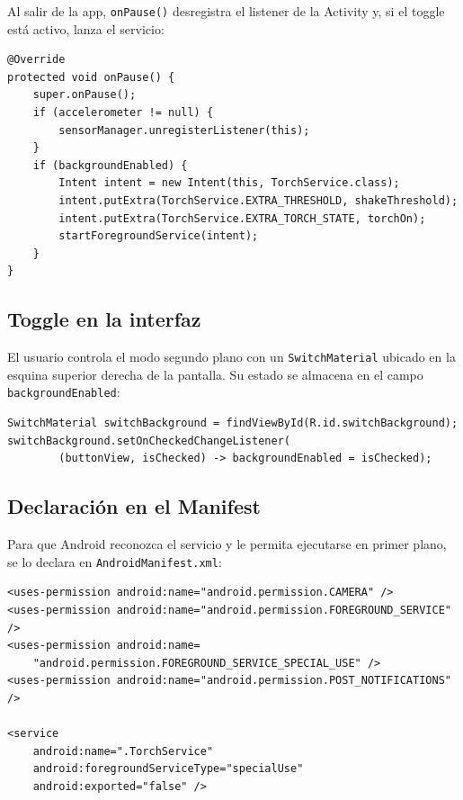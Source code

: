 \documentclass[12pt, a4paper]{article}
\begin{document}
Al salir de la app, \texttt{onPause()} desregistra el listener de la Activity
y, si el toggle est\'a activo, lanza el servicio:

\begin{lstlisting}[caption={Traspaso hacia el servicio al pausar --- \texttt{MainActivity.java}}]
@Override
protected void onPause() {
    super.onPause();
    if (accelerometer != null) {
        sensorManager.unregisterListener(this);
    }
    if (backgroundEnabled) {
        Intent intent = new Intent(this, TorchService.class);
        intent.putExtra(TorchService.EXTRA_THRESHOLD, shakeThreshold);
        intent.putExtra(TorchService.EXTRA_TORCH_STATE, torchOn);
        startForegroundService(intent);
    }
}
\end{lstlisting}

\subsection{Toggle en la interfaz}

El usuario controla el modo segundo plano con un \texttt{SwitchMaterial}
ubicado en la esquina superior derecha de la pantalla. Su estado se almacena
en el campo \texttt{backgroundEnabled}:

\begin{lstlisting}[caption={Toggle de modo segundo plano --- \texttt{MainActivity.java}}]
SwitchMaterial switchBackground = findViewById(R.id.switchBackground);
switchBackground.setOnCheckedChangeListener(
        (buttonView, isChecked) -> backgroundEnabled = isChecked);
\end{lstlisting}

\subsection{Declaraci\'on en el Manifest}

Para que Android reconozca el servicio y le permita ejecutarse en primer
plano, se lo declara en \texttt{AndroidManifest.xml}:

\begin{lstlisting}[style=vsxml, caption={Permisos y declaraci\'on del servicio --- \texttt{AndroidManifest.xml}}]
<uses-permission android:name="android.permission.CAMERA" />
<uses-permission android:name="android.permission.FOREGROUND_SERVICE" />
<uses-permission android:name=
    "android.permission.FOREGROUND_SERVICE_SPECIAL_USE" />
<uses-permission android:name="android.permission.POST_NOTIFICATIONS" />

<service
    android:name=".TorchService"
    android:foregroundServiceType="specialUse"
    android:exported="false" />
\end{lstlisting}
\end{document}
